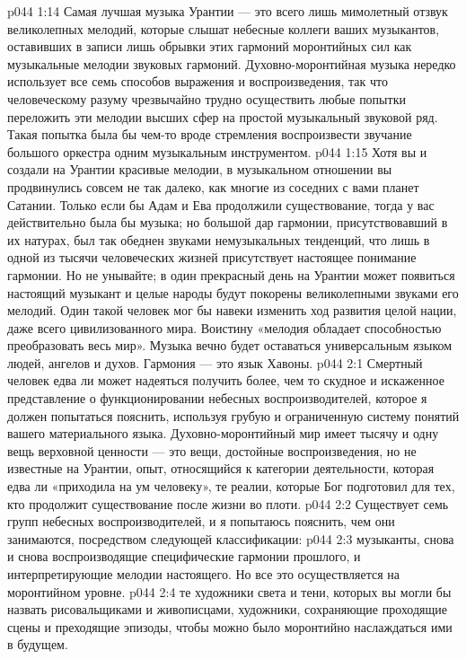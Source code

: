 \vs p044 1:14 \pc Самая лучшая музыка Урантии --- это всего лишь мимолетный отзвук великолепных мелодий, которые слышат небесные коллеги ваших музыкантов, оставивших в записи лишь обрывки этих гармоний моронтийных сил как музыкальные мелодии звуковых гармоний. Духовно\hyp{}моронтийная музыка нередко использует все семь способов выражения и воспроизведения, так что человеческому разуму чрезвычайно трудно осуществить любые попытки переложить эти мелодии высших сфер на простой музыкальный звуковой ряд. Такая попытка была бы чем\hyp{}то вроде стремления воспроизвести звучание большого оркестра одним музыкальным инструментом.
\vs p044 1:15 Хотя вы и создали на Урантии красивые мелодии, в музыкальном отношении вы продвинулись совсем не так далеко, как многие из соседних с вами планет Сатании. Только если бы Адам и Ева продолжили существование, тогда у вас действительно была бы музыка; но большой дар гармонии, присутствовавший в их натурах, был так обеднен звуками немузыкальных тенденций, что лишь в одной из тысячи человеческих жизней присутствует настоящее понимание гармонии. Но не унывайте; в один прекрасный день на Урантии может появиться настоящий музыкант и целые народы будут покорены великолепными звуками его мелодий. Один такой человек мог бы навеки изменить ход развития целой нации, даже всего цивилизованного мира. Воистину «мелодия обладает способностью преобразовать весь мир». Музыка вечно будет оставаться универсальным языком людей, ангелов и духов. Гармония --- это язык Хавоны.
\vs p044 2:1 Смертный человек едва ли может надеяться получить более, чем то скудное и искаженное представление о функционировании небесных воспроизводителей, которое я должен попытаться пояснить, используя грубую и ограниченную систему понятий вашего материального языка. Духовно\hyp{}моронтийный мир имеет тысячу и одну вещь верховной ценности --- это вещи, достойные воспроизведения, но не известные на Урантии, опыт, относящийся к категории деятельности, которая едва ли «приходила на ум человеку», те реалии, которые Бог подготовил для тех, кто продолжит существование после жизни во плоти.
\vs p044 2:2 \pc Существует семь групп небесных воспроизводителей, и я попытаюсь пояснить, чем они занимаются, посредством следующей классификации:
\vs p044 2:3 \bibnobreakspace {} музыканты, снова и снова воспроизводящие специфические гармонии прошлого, и интерпретирующие мелодии настоящего. Но все это осуществляется на моронтийном уровне.
\vs p044 2:4 \bibnobreakspace {} те художники света и тени, которых вы могли бы назвать рисовальщиками и живописцами, художники, сохраняющие проходящие сцены и преходящие эпизоды, чтобы можно было моронтийно наслаждаться ими в будущем.
